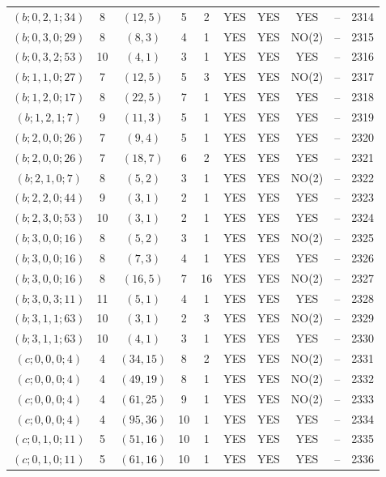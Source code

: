 \begin{longtable}{|c|c|c|c|c|c|c|c|c|c|}
$(b; 0, 2, 1; 34)$ & 8 & $(12, 5)$ & 5 & 2 & YES & YES & YES & -- & 2314\\
$(b; 0, 3, 0; 29)$ & 8 & $(8, 3)$ & 4 & 1 & YES & YES & NO(2) & -- & 2315\\
$(b; 0, 3, 2; 53)$ & 10 & $(4, 1)$ & 3 & 1 & YES & YES & YES & -- & 2316\\
$(b; 1, 1, 0; 27)$ & 7 & $(12, 5)$ & 5 & 3 & YES & YES & NO(2) & -- & 2317\\
$(b; 1, 2, 0; 17)$ & 8 & $(22, 5)$ & 7 & 1 & YES & YES & YES & -- & 2318\\
$(b; 1, 2, 1; 7)$ & 9 & $(11, 3)$ & 5 & 1 & YES & YES & YES & -- & 2319\\
$(b; 2, 0, 0; 26)$ & 7 & $(9, 4)$ & 5 & 1 & YES & YES & YES & -- & 2320\\
$(b; 2, 0, 0; 26)$ & 7 & $(18, 7)$ & 6 & 2 & YES & YES & YES & -- & 2321\\
$(b; 2, 1, 0; 7)$ & 8 & $(5, 2)$ & 3 & 1 & YES & YES & NO(2) & -- & 2322\\
$(b; 2, 2, 0; 44)$ & 9 & $(3, 1)$ & 2 & 1 & YES & YES & YES & -- & 2323\\
$(b; 2, 3, 0; 53)$ & 10 & $(3, 1)$ & 2 & 1 & YES & YES & YES & -- & 2324\\
$(b; 3, 0, 0; 16)$ & 8 & $(5, 2)$ & 3 & 1 & YES & YES & NO(2) & -- & 2325\\
$(b; 3, 0, 0; 16)$ & 8 & $(7, 3)$ & 4 & 1 & YES & YES & YES & -- & 2326\\
$(b; 3, 0, 0; 16)$ & 8 & $(16, 5)$ & 7 & 16 & YES & YES & NO(2) & -- & 2327\\
$(b; 3, 0, 3; 11)$ & 11 & $(5, 1)$ & 4 & 1 & YES & YES & YES & -- & 2328\\
$(b; 3, 1, 1; 63)$ & 10 & $(3, 1)$ & 2 & 3 & YES & YES & NO(2) & -- & 2329\\
$(b; 3, 1, 1; 63)$ & 10 & $(4, 1)$ & 3 & 1 & YES & YES & YES & -- & 2330\\
$(c; 0, 0, 0; 4)$ & 4 & $(34, 15)$ & 8 & 2 & YES & YES & NO(2) & -- & 2331\\
$(c; 0, 0, 0; 4)$ & 4 & $(49, 19)$ & 8 & 1 & YES & YES & NO(2) & -- & 2332\\
$(c; 0, 0, 0; 4)$ & 4 & $(61, 25)$ & 9 & 1 & YES & YES & NO(2) & -- & 2333\\
$(c; 0, 0, 0; 4)$ & 4 & $(95, 36)$ & 10 & 1 & YES & YES & YES & -- & 2334\\
$(c; 0, 1, 0; 11)$ & 5 & $(51, 16)$ & 10 & 1 & YES & YES & YES & -- & 2335\\
$(c; 0, 1, 0; 11)$ & 5 & $(61, 16)$ & 10 & 1 & YES & YES & YES & -- & 2336\\

\end{longtable}
